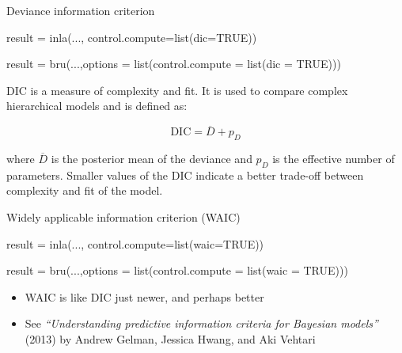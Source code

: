 \documentclass[
  ignorenonframetext,
]{beamer}
\newenvironment{Shaded}{\begin{snugshade}}{\end{snugshade}}
\newcommand{\AttributeTok}[1]{\textcolor[rgb]{0.77,0.63,0.00}{#1}}
\newcommand{\ConstantTok}[1]{\textcolor[rgb]{0.00,0.00,0.00}{#1}}
\newcommand{\FunctionTok}[1]{\textcolor[rgb]{0.00,0.00,0.00}{#1}}
\newcommand{\NormalTok}[1]{#1}
\newcommand{\OtherTok}[1]{\textcolor[rgb]{0.56,0.35,0.01}{#1}}
\begin{document}
\begin{frame}[fragile]{Deviance information criterion}
\protect\hypertarget{deviance-information-criterion}{}
\small

\begin{Shaded}
\begin{Highlighting}[]
\NormalTok{result }\OtherTok{=} \FunctionTok{inla}\NormalTok{(...,}
              \AttributeTok{control.compute=}\FunctionTok{list}\NormalTok{(}\AttributeTok{dic=}\ConstantTok{TRUE}\NormalTok{))}

\NormalTok{result }\OtherTok{=} \FunctionTok{bru}\NormalTok{(...,}\AttributeTok{options =} \FunctionTok{list}\NormalTok{(}\AttributeTok{control.compute =} 
                                  \FunctionTok{list}\NormalTok{(}\AttributeTok{dic =} \ConstantTok{TRUE}\NormalTok{)))}
\end{Highlighting}
\end{Shaded}

\normalsize

\hfill\break
DIC is a measure of complexity and fit. It is used to compare complex
hierarchical models and is defined as:

\[
\text{DIC} = \overline{D} + p_D
\]

where \(\overline{D}\) is the posterior mean of the deviance and \(p_D\)
is the effective number of parameters. Smaller values of the DIC
indicate a better trade-off between complexity and fit of the model.
\end{frame}

\begin{frame}[fragile]{Widely applicable information criterion (WAIC)}
\protect\hypertarget{widely-applicable-information-criterion-waic}{}
\small

\begin{Shaded}
\begin{Highlighting}[]
\NormalTok{result }\OtherTok{=} \FunctionTok{inla}\NormalTok{(...,}
              \AttributeTok{control.compute=}\FunctionTok{list}\NormalTok{(}\AttributeTok{waic=}\ConstantTok{TRUE}\NormalTok{))}

\NormalTok{result }\OtherTok{=} \FunctionTok{bru}\NormalTok{(...,}\AttributeTok{options =} \FunctionTok{list}\NormalTok{(}\AttributeTok{control.compute =} 
                                  \FunctionTok{list}\NormalTok{(}\AttributeTok{waic =} \ConstantTok{TRUE}\NormalTok{)))}
\end{Highlighting}
\end{Shaded}

\normalsize

\begin{itemize}
\item
  WAIC is like DIC just newer, and perhaps better
\item
  See \emph{``Understanding predictive information criteria for Bayesian
  models''} (2013) by Andrew Gelman, Jessica Hwang, and Aki Vehtari
\end{itemize}
\end{frame}
\end{document}
